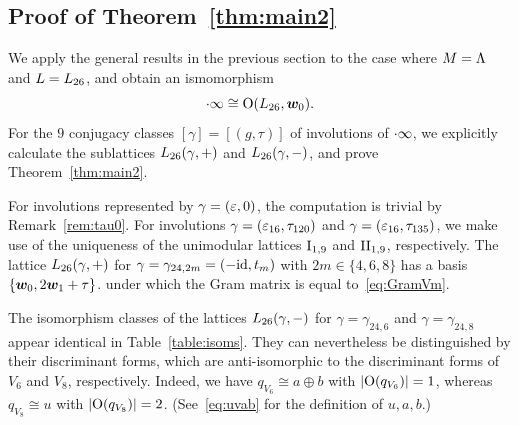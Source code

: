 \documentclass{amsart} %
\begin{document}
\subsection{Proof of Theorem~\ref{thm:main2}}\label{subsec:proofmain2}
%
We apply the general results in the previous section to the case where $M=\Lambda$ and $L=L_{26}$,
and obtain an ismomorphism 
\[
\cdot \infty\cong \mathord{\mathrm{O}}(L_{26}, \boldsymbol{w}_0).
\]
%
For the $9$ conjugacy classes 
$[\gamma]=[(g, \tau)]$ of involutions of $\cdot \infty$,
we explicitly calculate the sublattices $L_{26}(\gamma, +)$ and $L_{26}(\gamma, -)$, 
and prove Theorem~\ref{thm:main2}.
%
\begin{remark}
For involutions represented by $\gamma=(\varepsilon, 0)$,
the computation is trivial by Remark~\ref{rem:tau0}.
For involutions $\gamma=(\varepsilon_{16}, \tau_{120})$ and $\gamma=(\varepsilon_{16}, \tau_{135})$,
we make use of the uniqueness of the unimodular lattices $\mathrm{I}_{1, 9}$ and $\mathrm{II}_{1, 9}$,
respectively.
The lattice $L_{26}(\gamma,+)$ for $\gamma=\gamma_{24,2m}=(-\mathord{\mathrm{id}}, t_m)$
with $2m \in \{4,6,8\}$ has a basis $\{\boldsymbol{w}_0, 2\boldsymbol{w}_1+\tau\}$.
under which the Gram matrix is equal to~\eqref{eq:GramVm}.
\end{remark}
%
%
%
%
%
\begin{remark}
The isomorphism classes of the lattices $L_{26}(\gamma,-)$ for $\gamma=\gamma_{24,6}$ 
and $\gamma=\gamma_{24,8}$ 
appear identical in Table~\ref{table:isoms}. 
They can nevertheless be distinguished by their discriminant forms, 
which are anti-isomorphic to the discriminant forms of $V_6$ and $V_8$, respectively. 
Indeed, we have $q_{V_6}\cong a\oplus b$ with $|\mathord{\mathrm{O}}(q_{V_6})|=1$, 
whereas $q_{V_8}\cong u$ with $|\mathord{\mathrm{O}}(q_{V_8})|=2$.
(See~\eqref{eq:uvab} for the definition of $u, a, b$.)
 \end{remark}
%
%
%
\end{document}

